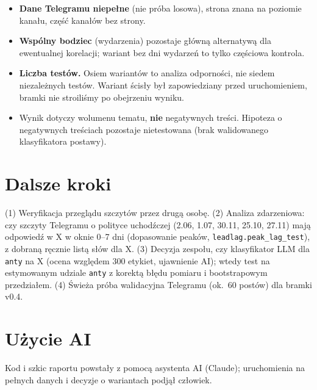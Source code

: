 \documentclass[10pt,a4paper]{article}
\begin{document}
\begin{itemize}
\item \textbf{Dane Telegramu niepełne} (nie próba losowa), strona znana na poziomie kanału, część kanałów bez strony.
\item \textbf{Wspólny bodziec} (wydarzenia) pozostaje główną alternatywą dla ewentualnej korelacji; wariant bez dni wydarzeń to tylko częściowa kontrola.
\item \textbf{Liczba testów.} Osiem wariantów to analiza odporności, nie siedem niezależnych testów. Wariant ścisły był zapowiedziany przed uruchomieniem, bramki nie stroiliśmy po obejrzeniu wyniku.
\item Wynik dotyczy wolumenu tematu, \textbf{nie} negatywnych treści. Hipoteza o negatywnych treściach pozostaje nietestowana (brak walidowanego klasyfikatora postawy).
\end{itemize}

\section{Dalsze kroki}
(1) Weryfikacja przeglądu szczytów przez drugą osobę. (2) Analiza zdarzeniowa: czy szczyty Telegramu o polityce uchodźczej (2.06, 1.07, 30.11, 25.10, 27.11) mają odpowiedź w X w oknie 0--7 dni (dopasowanie peaków, \texttt{leadlag.peak\_lag\_test}), z dobraną ręcznie listą słów dla X. (3) Decyzja zespołu, czy klasyfikator LLM dla \texttt{anty} na X (ocena względem 300 etykiet, ujawnienie AI); wtedy test na estymowanym udziale \texttt{anty} z korektą błędu pomiaru i bootstrapowym przedziałem. (4) Świeża próba walidacyjna Telegramu (ok.\ 60 postów) dla bramki v0.4.

\section*{Użycie AI}
Kod i szkic raportu powstały z pomocą asystenta AI (Claude); uruchomienia na pełnych danych i decyzje o wariantach podjął człowiek.
\end{document}
